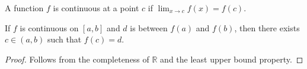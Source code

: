 \begin{definition}[Continuity]
    A function $f$ is continuous at a point $c$ if
    $\lim_{x \to c} f(x) = f(c)$.
\end{definition}

\begin{theorem}
    If $f$ is continuous on $[a,b]$ and $d$ is between $f(a)$ and $f(b)$,
    then there exists $c \in (a,b)$ such that $f(c) = d$.
\end{theorem}

\begin{proof}
    Follows from the completeness of $\mathbb{R}$ and the
    least upper bound property.
\end{proof}
